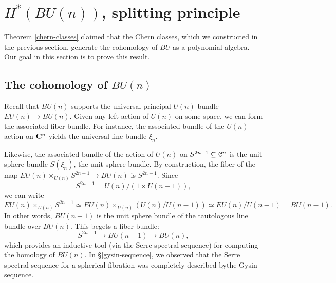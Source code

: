 \section{$H^\ast(BU(n))$, splitting principle}\label{homology-bun}
%
%
Theorem \ref{chern-classes} claimed that the Chern classes, which we
constructed in the previous section, generate the cohomology of $BU$ as a
polynomial algebra. Our goal in this section is to prove this result.
\subsection{The cohomology of $BU(n)$}
Recall that $BU(n)$ supports the universal principal $U(n)$-bundle $EU(n)\to
BU(n)$. Given any left action of $U(n)$ on some space, we can form the
associated fiber bundle. For instance, the associated bundle of the
$U(n)$-action on $\mathbf C^n$ yields the universal line bundle $\xi_n$.

Likewise, the associated bundle of the action of $U(n)$ on $S^{2n-1}\subseteq
\mathcal C^n$ is the unit sphere bundle $S(\xi_n)$, the unit sphere bundle. By
construction, the fiber of the map $EU(n)\times_{U(n)}S^{2n-1}\to BU(n)$ is
$S^{2n-1}$. Since
$$S^{2n-1} = U(n)/(1\times U(n-1)),$$
we can write
$$EU(n)\times_{U(n)}S^{2n-1} \simeq EU(n)\times_{U(n)} (U(n)/U(n-1)) \simeq
EU(n)/U(n-1) = BU(n-1).$$
In other words, $BU(n-1)$ is the unit sphere bundle of the tautologous line
bundle over $BU(n)$. This begets a fiber bundle:
$$S^{2n-1}\to BU(n-1)\to BU(n),$$
which provides an inductive tool (via the Serre spectral sequence) for
computing the homology of $BU(n)$. In \S \ref{gysin-sequence}, we observed that
the Serre spectral sequence for a spherical fibration was completely described
bythe Gysin sequence.

